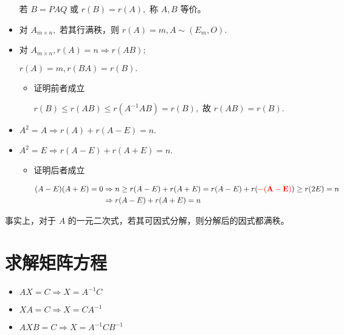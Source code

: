 \begin{itemize}
    若 $ B = PAQ $ 或 $ r(B) = r(A), $ 称 $ A,B $ 等价。
    \item 对 $ A_{m\times n}, $ 若其行满秩，则 $ r(A) = m, A\sim (E_m,O). $ 
    \item 对 $ A_{m\times n}, r(A) = n \Rightarrow r(AB); $ 

    $ r(A) = m, r(BA) = r(B). $ 
    \begin{itemize}
        \item 证明前者成立
        
        $ r(B)\leq r(AB) \leq r(A^{-1} AB) = r(B), $ 故 $ r(AB) = r(B). $ 
    \end{itemize}
\end{itemize}


\begin{itemize}
    \item $ A^2 = A \Rightarrow r(A) + r(A-E) = n. $ 
    \item $ A^2 = E \Rightarrow r(A - E) + r(A + E) = n. $ 
    \begin{itemize}
        \item 证明后者成立
        
        \begin{equation*}
            \begin{aligned}
                (A-E)(A+E)= 0 &\Rightarrow  n \geq r(A-E) + r(A+E) = r(A-E) + r(\textcolor{red}{\bf{-(A-E)}}) \geq r(2E) = n
                \\ &\Rightarrow r(A-E) + r(A+E) = n
            \end{aligned}
        \end{equation*}
    \end{itemize}
\end{itemize}

事实上，对于 $ A $ 的一元二次式，若其可因式分解，则分解后的因式都满秩。

\section{求解矩阵方程}


\begin{itemize}
    \item $ AX = C\Rightarrow X = A^{-1}C $ 
    \item $ XA = C\Rightarrow X = CA^{-1} $ 
    \item $ AXB = C\Rightarrow X = A^{-1}CB^{-1} $ 
\end{itemize}

